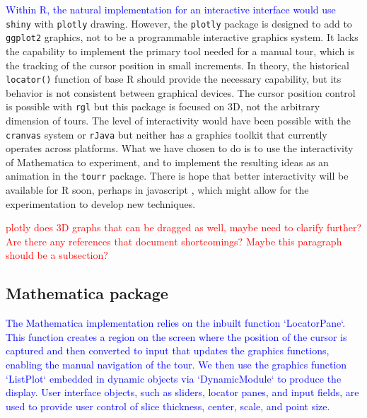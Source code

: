 \documentclass[]{interact}
\theoremstyle{plain}%
\theoremstyle{definition}
\theoremstyle{remark}
\begin{document}
\textcolor{blue}{Within R, the natural implementation for an interactive interface would use}
\texttt{shiny} \citep{shinym} with \texttt{plotly} \citep{plotly}
drawing. However, the \texttt{plotly} package is designed to add to
\texttt{ggplot2} \citep{ggplot2} graphics, not to be a programmable
interactive graphics system. It lacks the capability to implement the
primary tool needed for a manual tour, which is the tracking of the
cursor position in small increments. In theory, the historical
\texttt{locator()} function of base R should provide the necessary
capability, but its behavior is not consistent between graphical
devices. The cursor position control is possible with \texttt{rgl}
\citep{rgl} but this package is focused on 3D, not the arbitrary
dimension of tours. The level of interactivity would have been possible
with the \texttt{cranvas} system \citep{cranvas} or \texttt{rJava}
\citep{rJava} but neither has a graphics toolkit that currently operates
across platforms. What we have chosen to do is to use the interactivity
of Mathematica to experiment, and to implement the resulting ideas as an
animation in the \texttt{tourr} \citep{tourr} package. There is hope
that better interactivity will be available for R soon, perhaps in
javascript \citep[e.g.][\citet{detourr}]{langevitour}, which might allow
for the experimentation to develop new techniques.

\textcolor{red}{plotly does 3D graphs that can be dragged as well, maybe need to clarify further? Are there any references that document shortcomings? Maybe this paragraph should be a subsection?}

\hypertarget{mathematica-package}{%
\subsection{Mathematica package}\label{mathematica-package}}

\textcolor{blue}{The Mathematica implementation relies on the inbuilt function  `LocatorPane`. This function creates a region on the screen where the position of the cursor is captured and then converted to input that updates the graphics functions, enabling the manual navigation of the tour. We then use the graphics function `ListPlot` embedded in dynamic objects via  `DynamicModule` to produce the display. User interface objects, such as sliders, locator panes, and input fields, are used to provide user control of slice thickness, center, scale, and point size.}
\end{document}

